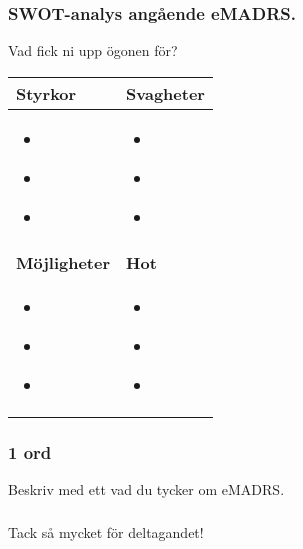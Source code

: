 \documentclass[english]{beamer}
\begin{document}
\begin{frame}
\frametitle{SWOT-analys angående eMADRS.}

\textcolor{lila}{Vad fick ni upp ögonen för?}

         \begin{tabular}{|p{}|p{}|}
             \hline \bfseries Styrkor &\bfseries Svagheter  \\\hline 
             {\parbox{0.2\textwidth}{
                 \begin{itemize}                    
                     \item \  
                     \item \  
                     \item \               
                     \end{itemize} }}
                     &              {\parbox{0.2\textwidth}{
                 \begin{itemize}                    
                     \item \  
                     \item \  
                     \item \               
                     \end{itemize} }}
 \\\hline
             \hline \bfseries Möjligheter &\bfseries Hot  \\\hline 
             {\parbox{0.2\textwidth}{
                 \begin{itemize}                    
                     \item \  
                     \item \  
                     \item \               
                     \end{itemize} }}
                     &              {\parbox{0.2\textwidth}{
                 \begin{itemize}                    
                     \item \  
                     \item \  
                     \item \               
                     \end{itemize} }}
 \\\hline                     
        \end{tabular}

\end{frame}

\begin{frame}
\frametitle{1 ord}
	\textcolor{lila}{Beskriv med ett vad du tycker om eMADRS.}\\
\end{frame}

\begin{frame}
\frametitle{}
	Tack så mycket för deltagandet!\\
\end{frame}
\end{document}
